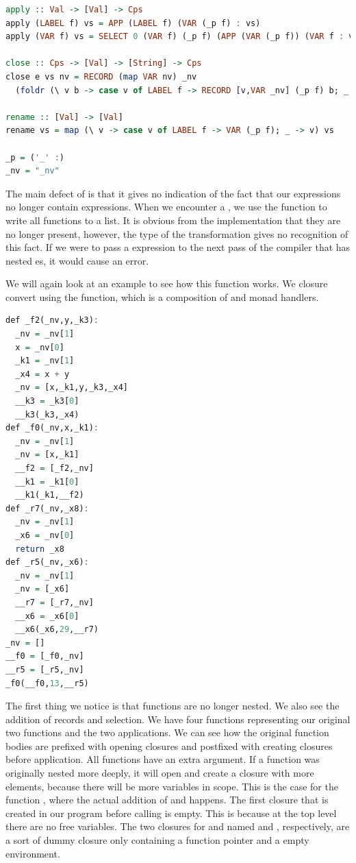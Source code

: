 {\begin{lstlisting}[language=Haskell]
apply :: Val -> [Val] -> Cps
apply (LABEL f) vs = APP (LABEL f) (VAR (_p f) : vs)
apply (VAR f) vs = SELECT 0 (VAR f) (_p f) (APP (VAR (_p f)) (VAR f : vs))

close :: Cps -> [Val] -> [String] -> Cps
close e vs nv = RECORD (map VAR nv) _nv
  (foldr (\ v b -> case v of LABEL f -> RECORD [v,VAR _nv] (_p f) b; _ -> b) e vs)

rename :: [Val] -> [Val]
rename vs = map (\ v -> case v of LABEL f -> VAR (_p f); _ -> v) vs

_p = ('_' :)
_nv = "_nv"
\end{lstlisting}

The main defect of  is that it gives no indication of the fact that our  expressions no longer contain  expressions. When we encounter a , we use the  function to write all functions to a list. It is obvious from the implementation that they are no longer present, however, the type of the transformation gives no recognition of this fact. If we were to pass a  expression to the next pass of the compiler that has nested es, it would cause an error.

We will again look at an example to see how this function works. We closure convert  using the  function, which is a composition of  and monad handlers.

\begin{lstlisting}[language=Haskell]
def _f2(_nv,y,_k3):
  _nv = _nv[1]
  x = _nv[0]
  _k1 = _nv[1]
  _x4 = x + y
  _nv = [x,_k1,y,_k3,_x4]
  __k3 = _k3[0]
  __k3(_k3,_x4)
def _f0(_nv,x,_k1):
  _nv = _nv[1]
  _nv = [x,_k1]
  __f2 = [_f2,_nv]
  __k1 = _k1[0]
  __k1(_k1,__f2)
def _r7(_nv,_x8):
  _nv = _nv[1]
  _x6 = _nv[0]
  return _x8
def _r5(_nv,_x6):
  _nv = _nv[1]
  _nv = [_x6]
  __r7 = [_r7,_nv]
  __x6 = _x6[0]
  __x6(_x6,29,__r7)
_nv = []
__f0 = [_f0,_nv]
__r5 = [_r5,_nv]
_f0(__f0,13,__r5)
\end{lstlisting}

The first thing we notice is that functions are no longer nested. We also see the addition of records and selection. We have four functions representing our original two functions and the two applications. We can see how the original function bodies are prefixed with opening closures and postfixed with creating closures before application. All functions have an extra  argument. If a function was originally nested more deeply, it will open and create a closure with more elements, because there will be more variables in scope. This is the case for the function , where the actual addition of  and  happens. The first closure that is created in our program before calling  is empty. This is because at the top level there are no free variables. The two closures for  and  named  and , respectively, are a sort of dummy closure only containing a function pointer and a empty environment.

}
